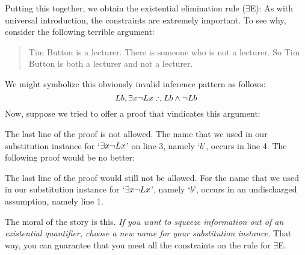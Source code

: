 Putting this together, we obtain the existential elimination rule ($\exists$E):
As with universal introduction, the constraints are extremely important. To see why, consider the following terrible argument:
	\begin{quote}
		Tim Button is a lecturer. There is someone who is not a lecturer. So Tim Button is both a lecturer and not a lecturer.
	\end{quote}
We might symbolize this obviously invalid inference pattern as follows:
$$Lb, \exists x \enot Lx \therefore Lb \eand \enot Lb$$
Now, suppose we tried to offer a proof that vindicates this argument:
\begin{pf}
	\open
	\close
\end{pf}
The last line of the proof is not allowed. The name that we used in our substitution instance for `$\exists x \neg Lx$' on line 3, namely `$b$', occurs in line 4. The following proof would be no better:
\begin{pf}
	\open
	\close
\end{pf}
The last line of the proof would still not be allowed. For the name that we used in our substitution instance for `$\exists x \neg Lx$', namely `$b$', occurs in an undischarged assumption, namely line 1.

The moral of the story is this. \emph{If you want to squeeze information out of an existential quantifier, choose a new name for your substitution instance.} That way, you can guarantee that you meet all the constraints on the rule for $\exists$E.

